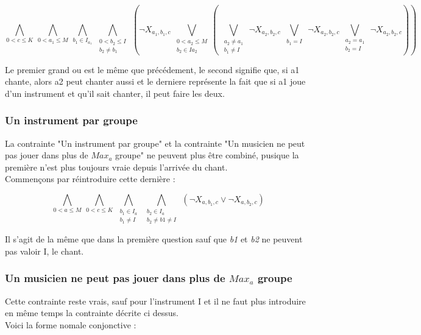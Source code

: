 \documentclass[11pt]{article}
\begin{document}
$$\bigwedge\limits_{0<c\le K}\ \bigwedge\limits_{0<a_1\le M}\ \bigwedge\limits_{b_1\in I_{a_1}}\ \bigwedge\limits_{\substack{0<b_2\le I \\ b_2 \ne b_1}}\ \left(\neg X_{a_1,b_1,c} \ \bigvee\limits_{\substack{0<a_2\le M \\ b_2 \in I{a_2}}}\left( \
\bigvee\limits_{\substack{a_2 \ne a_1 \\ b_1 \ne I}}\ \neg X_{a_2,b_2,c}\ 
\bigvee\limits_{\substack{b_1 = I}}\ \neg X_{a_2,b_2,c}\ 
\bigvee\limits_{\substack{a_2 = a_1 \\ b_2 = I}}\ \neg X_{a_2,b_2,c}\right)\right)$$

Le premier grand ou est le même que précédement, le second signifie que, si a1 chante, alors a2 peut chanter aussi et le derniere représente la fait que si a1 joue d'un instrument et qu'il sait chanter, il peut faire les deux.

\subsubsection{Un instrument par groupe}

La contrainte "Un instrument par groupe" et la contrainte "Un musicien ne peut pas jouer dans plus de $Max_a$ groupe" ne peuvent plus être combiné, pusique la première n'est plus toujours vraie depuis l'arrivée du chant.\\

Commençons par réintroduire cette dernière :

$$\bigwedge\limits_{0<a\le M}\ \bigwedge\limits_{0<c\le K}\ \bigwedge\limits_{\substack{b_1\in I_a \\ b_1 \ne I}}\ \bigwedge\limits_{\substack{b_2\in I_a \\ b_2 \ne b1 \ne I}}\ \left(\neg X_{a,b_1,c} \vee \neg X_{a,b_2,c}\right)$$

Il s'agit de la même que dans la première question sauf que \textit{b1} et \textit{b2} ne peuvent pas valoir I, le chant.

\subsubsection{Un musicien ne peut pas jouer dans plus de $Max_a$ groupe}
Cette contrainte reste vrais, sauf pour l'instrument I et il ne faut plus introduire en même temps la contrainte décrite ci dessus.\\
Voici la forme nomale conjonctive :\\
\end{document}

